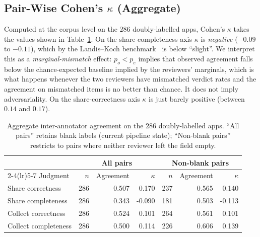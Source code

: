 \documentclass[11pt,a4paper]{article}
\begin{document}
\subsection{Pair-Wise Cohen's $\kappa$ (Aggregate)}
\label{sec:pair-kappa}

Computed at the corpus level on the $286$ doubly-labelled apps,
Cohen's $\kappa$ takes the values shown in Table~\ref{tab:kappa-agg}.
On the share-completeness axis $\kappa$ is \emph{negative} ($-0.09$
to $-0.11$), which by the Landis--Koch
benchmark~\citep{landis1977measurement} is below ``slight''.
We interpret this as a \emph{marginal-mismatch} effect:
$p_o<p_e$ implies that observed agreement falls below the
chance-expected baseline implied by the reviewers' marginals, which
is what happens whenever the two reviewers have mismatched verdict
rates and the agreement on mismatched items is no better than
chance. It does not imply adversariality. On the share-correctness axis $\kappa$ is just
barely positive (between $0.14$ and $0.17$).

\begin{table}[!htbp]
\centering\small
\caption{Aggregate inter-annotator agreement on the $286$
doubly-labelled apps. ``All pairs'' retains blank labels (current
pipeline state); ``Non-blank pairs'' restricts to pairs where neither
reviewer left the field empty.}
\label{tab:kappa-agg}
\begin{tabular}{lrrrrrr}
\toprule
& \multicolumn{3}{c}{All pairs} & \multicolumn{3}{c}{Non-blank pairs} \\
\cmidrule(lr){2-4}\cmidrule(lr){5-7}
Judgment & $n$ & Agreement & $\kappa$ & $n$ & Agreement & $\kappa$ \\
\midrule
Share correctness     & 286 & 0.507 &  0.170 & 237 & 0.565 &  0.140 \\
Share completeness    & 286 & 0.343 & -0.090 & 181 & 0.503 & -0.113 \\
Collect correctness   & 286 & 0.524 &  0.101 & 264 & 0.561 &  0.101 \\
Collect completeness  & 286 & 0.500 &  0.114 & 226 & 0.606 &  0.139 \\
\bottomrule
\end{tabular}
\end{table}
\end{document}

